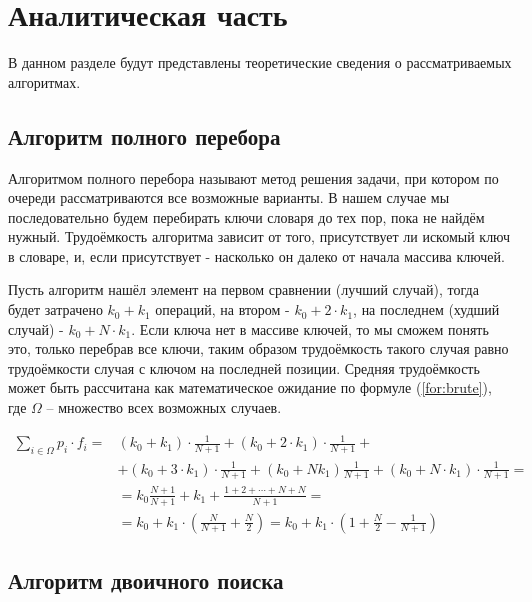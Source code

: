 \chapter{Аналитическая часть}
В данном разделе будут представлены теоретические сведения о рассматриваемых алгоритмах.


\section{Алгоритм полного перебора}

Алгоритмом полного перебора \cite{brute} называют метод решения задачи, при котором по очереди рассматриваются все возможные варианты. В нашем случае мы последовательно будем перебирать ключи словаря до тех пор, пока не найдём нужный. Трудоёмкость алгоритма зависит от того, присутствует ли искомый ключ в словаре, и, если присутствует - насколько он далеко от начала массива ключей.

Пусть алгоритм нашёл элемент на первом сравнении (лучший случай), тогда будет затрачено $k_0 + k_1$ операций, на втором - $k_0 + 2 \cdot k_1$, на последнем (худший случай) - $k_0 + N \cdot k_1$. Если ключа нет в массиве ключей, то мы сможем понять это, только перебрав все ключи, таким образом трудоёмкость такого случая равно трудоёмкости случая с ключом на последней позиции. Средняя трудоёмкость может быть рассчитана как математическое ожидание по формуле (\ref{for:brute}), где $\Omega$ -- множество всех возможных случаев.

\begin{equation}
    \label{for:brute}
    \begin{aligned}
        \sum\limits_{i \in \Omega} p_i \cdot f_i = & (k_0 + k_1) \cdot \frac{1}{N + 1} + (k_0 + 2 \cdot k_1) \cdot \frac{1}{N+1} +\\
        & + (k_0 + 3 \cdot k_1) \cdot \frac{1}{N + 1} + (k_0 + Nk_1)\frac{1}{N + 1} + (k_0 + N \cdot k_1) \cdot \frac{1}{N + 1} =\\
        & = k_0\frac{N+1}{N+1}+k_1+\frac{1 + 2 + \cdots + N + N}{N + 1} = \\
        & = k_0 + k_1 \cdot \left(\frac{N}{N + 1} + \frac{N}{2}\right) = k_0 + k_1 \cdot \left(1 + \frac{N}{2} - \frac{1}{N + 1}\right)
    \end{aligned}
\end{equation}




\section{Алгоритм двоичного поиска}

